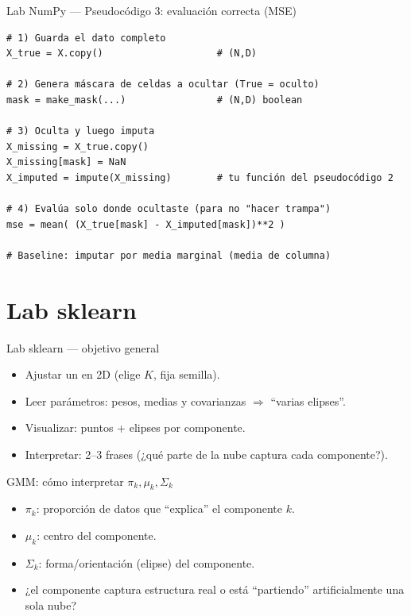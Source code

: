 \begin{frame}[fragile]{Lab NumPy — Pseudocódigo 3: evaluación correcta (MSE)}
\begin{verbatim}
# 1) Guarda el dato completo
X_true = X.copy()                    # (N,D)

# 2) Genera máscara de celdas a ocultar (True = oculto)
mask = make_mask(...)                # (N,D) boolean

# 3) Oculta y luego imputa
X_missing = X_true.copy()
X_missing[mask] = NaN
X_imputed = impute(X_missing)        # tu función del pseudocódigo 2

# 4) Evalúa solo donde ocultaste (para no "hacer trampa")
mse = mean( (X_true[mask] - X_imputed[mask])**2 )

# Baseline: imputar por media marginal (media de columna)
\end{verbatim}
\end{frame}

\section[Lab sklearn]{Lab sklearn\label{sec:labsklearn}}

\begin{frame}{Lab sklearn — objetivo general}
\begin{itemize}
  \item Ajustar un  en 2D (elige \(K\), fija semilla).
  \item Leer parámetros: pesos, medias y covarianzas \(\Rightarrow\) “varias elipses”.
  \item Visualizar: puntos + elipses por componente.
  \item Interpretar: 2--3 frases (¿qué parte de la nube captura cada componente?).
\end{itemize}
\end{frame}

\begin{frame}{GMM: cómo interpretar \(\pi_k,\mu_k,\Sigma_k\)}
\begin{itemize}
  \item \(\pi_k\): proporción de datos que “explica” el componente \(k\).
  \item \(\mu_k\): centro del componente.
  \item \(\Sigma_k\): forma/orientación (elipse) del componente.
  \item {} ¿el componente captura estructura real o está “partiendo” artificialmente una sola nube?
\end{itemize}
\end{frame}

